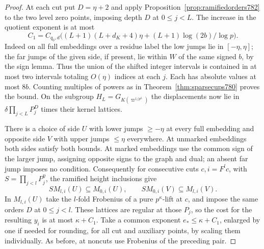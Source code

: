 \documentclass[a4paper,11pt]{article}
\theoremstyle{definition}
\theoremstyle{remark}
\numberwithin{equation}{section}
\begin{document}
\begin{proof}
At each cut put \(D=\eta+2\) and apply
Proposition~\ref{prop:ramifiedorders782} to the two
level zero points, imposing depth \(D\) at \(0\le j<L\).
The increase in the quotient exponent is at most
\[
 C_1=C_{q_0,d}\big((L+1)(L+d_K+4)\eta
                       +(L+1)\log(2b)/\log p\big).
\]
Indeed on all full embeddings over a residue label
the low jumps lie in \([-\eta,\eta]\); the far jumps
of the given side, if present, lie within \(W\) of
the same signed \(b\), by the sign lemma. Thus the
union of the shifted integer intervals is contained
in at most two intervals totaling \(O(\eta)\) indices
at each \(j\). Each has absolute values at most \(8b\).
Counting multiples of powers as in
Theorem~\ref{thm:sparsecups780} proves the bound.
On the subgroup \(H_L=G_{K(\varpi^{1/p^L})}\) the
displacements now lie in
\(\delta\prod_{j<L} P_j^D\) times their kernel lattices.

There is a choice of side \(U\) with lower jumps
\(\ge-\eta\) at every full embedding and opposite side
\(V\) with upper jumps \(\le\eta\) everywhere. At
unmarked embeddings both sides satisfy both bounds.
At marked embeddings use the common sign of the larger
jump, assigning opposite signs to the graph and dual;
an absent far jump imposes no condition. Consequently
for consecutive cuts \(c,i=F^l c\), with
\(S=\prod_{j<l}P_j^\eta\), the ramified height
inclusions give
\[
      S M_{l,i}(U)\subseteq M_{0,i}(U),\qquad
      S M_{0,i}(V)\subseteq M_{l,i}(V).
\]
In \(M_{l,i}(U)\) take the \(l\)-fold Frobenius of a
pure \(p^\kappa\)-lift at \(c\), and impose the same
orders \(D\) at \(0\le j<l\). These lattices are regular
at those \(P_j\), so the cost for the resulting \(y_i\)
is at most \(\kappa+C_1\). Take a common exponent
\(e_*\le\kappa+C_1\), enlarged by one if needed for
rounding, for all cut and auxiliary points, by scaling
them individually. As before, at noncuts use Frobenius
of the preceding pair.


\end{proof}
\end{document}
